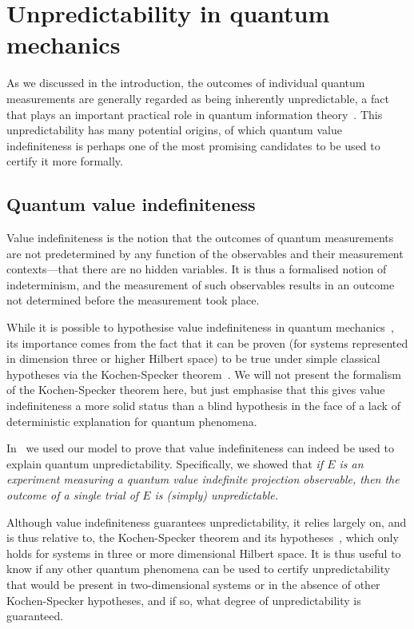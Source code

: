 \documentclass[information,article,submit,moreauthors,pdftex,12pt,a4paper]{mdpi}
\theoremstyle{mdpi}
\newcounter{thm}
\newcounter{ex}
\newcounter{re}
\theoremstyle{mdpidefinition}
\begin{document}
\section{Unpredictability in quantum mechanics}

As we discussed in the introduction, the outcomes of individual quantum measurements are generally regarded as being inherently unpredictable, a fact that plays an important practical role in quantum information theory~\cite{10.1038/nature09008,gisin-qc-rmp}.
This unpredictability has many potential origins, of which quantum value indefiniteness is perhaps one of the most promising candidates to be used to certify it more formally.

\subsection{Quantum value indefiniteness}
\label{sec:VI}

Value indefiniteness is the notion that the outcomes of quantum measurements are not predetermined by any function of the observables and their measurement contexts---that there are no hidden variables.
It is thus a formalised notion of indeterminism, and the measurement of such observables results in an outcome not determined before the measurement took place.

While it is possible to hypothesise value indefiniteness in quantum mechanics~\cite{zeil-99}, its importance comes from the fact that it can be proven (for systems represented in dimension three or higher Hilbert space) to be true  under simple classical hypotheses via the Kochen-Specker theorem~\cite{kochen1,2012-incomput-proofsCJ,2015-AnalyticKS}.
We will not present the formalism of the Kochen-Specker theorem here, but just  emphasise that this gives value indefiniteness a more solid status than a blind hypothesis in the face of a lack of deterministic explanation for quantum phenomena.

In~\cite{DBLP:conf/birthday/AbbottCS15} we used our model to prove that value indefiniteness can indeed be used to explain quantum unpredictability.
Specifically, we showed that
%
	\emph{if $E$ is an experiment measuring a quantum value indefinite projection observable, then the outcome of a single trial of $E$ is (simply) unpredictable.}

Although value indefiniteness guarantees unpredictability, it relies largely on, and is thus relative to, the Kochen-Specker theorem and its hypotheses~\cite{kochen1,pitowsky:218,2012-incomput-proofsCJ}, which only holds for systems in three or more dimensional Hilbert space.
It is thus useful to know if any other quantum phenomena can be used to certify unpredictability that would be present in two-dimensional systems or in the absence of other Kochen-Specker hypotheses, and if so, what degree of unpredictability is guaranteed.
\end{document}
